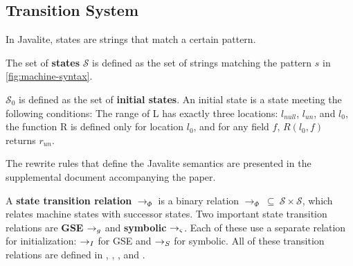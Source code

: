 

\subsection{Transition System}

In Javalite, states are strings that match a certain pattern. 



\begin{definition}
\label{def:state}
The set of \textbf{states} $\mathcal{S}$ is defined as the set of strings matching the pattern $s$ in \ref{fig:machine-syntax}.
\end{definition}

\begin{definition}
\label{def:initstate}
$\mathcal{S}_0$ is defined as the set of \textbf{initial states}. An initial state is a state meeting the following conditions:  The range of L has exactly three locations: $l_{null}$, $l_{un}$, and $l_0$, the function R is defined only for location $l_0$, and for any field $f$, $R(l_0,f)$ returns $r_{un}$. 
\end{definition}

The rewrite rules that define the Javalite semantics are presented in
the supplemental document accompanying the paper.


\begin{definition}
A \textbf{state transition relation} $\rightarrow_{\Phi}$ is a binary relation $\rightarrow_{\Phi}\ \subseteq\ \mathcal{S} \times \mathcal{S} $, which relates machine states with successor states. Two important state transition relations are \textbf{GSE} $\rightarrow_{g}$ and \textbf{symbolic} $\rightarrow_{\varsigma}$. Each of these use a separate relation for initialization: $\rightarrow_I$ for GSE and $\rightarrow_S$ for symbolic. All of these transition relations are defined in , , , and .
\end{definition}

